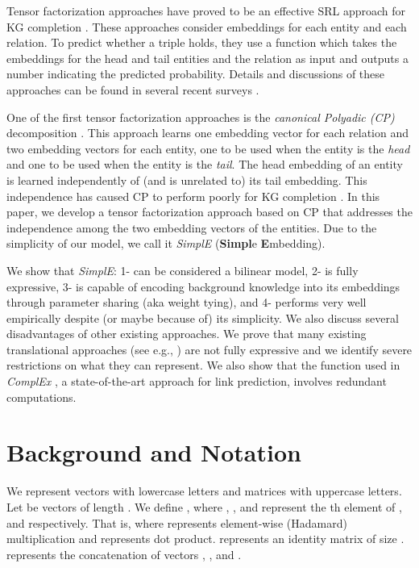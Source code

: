 \documentclass{article}
\begin{document}
Tensor factorization approaches have proved to be an effective SRL approach for KG completion \cite{nickel2012factorizing,bordes2013translating,trouillon2016complex,StransE}. These approaches consider embeddings for each entity and each relation. To predict whether a triple holds, they use a function which takes the embeddings for the head and tail entities and the relation as input and outputs a number indicating the predicted probability. Details and discussions of these approaches can be found in several recent surveys \cite{nguyen2017overview,wang2017knowledge}.

One of the first tensor factorization approaches is the \emph{canonical Polyadic (CP)} decomposition \cite{hitchcock1927expression}. This approach learns one embedding vector for each relation and two embedding vectors for each entity, one to be used when the entity is the \emph{head} and one to be used when the entity is the \emph{tail}. 
The head embedding of an entity is learned independently of (and is unrelated to) its tail embedding.
This independence has caused CP to perform poorly for KG completion \cite{trouillon2017knowledge}. In this paper, we develop a tensor factorization approach based on CP that addresses the independence among the two embedding vectors of the entities. Due to the simplicity of our model, we call it \emph{SimplE} (\textbf{Simpl}e \textbf{E}mbedding). 

We show that \emph{SimplE}: 1- can be considered a bilinear model, 2- is fully expressive, 3- is capable of encoding background knowledge into its embeddings through parameter sharing (aka weight tying), and 4- performs very well empirically despite (or maybe because of) its simplicity. We also discuss several disadvantages of other existing approaches. We prove that many existing translational approaches (see e.g., \cite{bordes2013translating,ji2015knowledge,wang2014knowledge,StransE}) are not fully expressive and we identify severe restrictions on what they can represent. We also show that the function used in \emph{ComplEx} \cite{trouillon2016complex,trouillon2017knowledge}, a state-of-the-art approach for link prediction, involves redundant computations.

\section{Background and Notation}
We represent vectors with lowercase letters and matrices with uppercase letters. Let  be vectors of length . We define , where , , and  represent the th element of ,  and  respectively. That is,  where  represents element-wise (Hadamard) multiplication and  represents dot product.  represents an identity matrix of size .  represents the concatenation of  vectors , ,  and .
\end{document}
